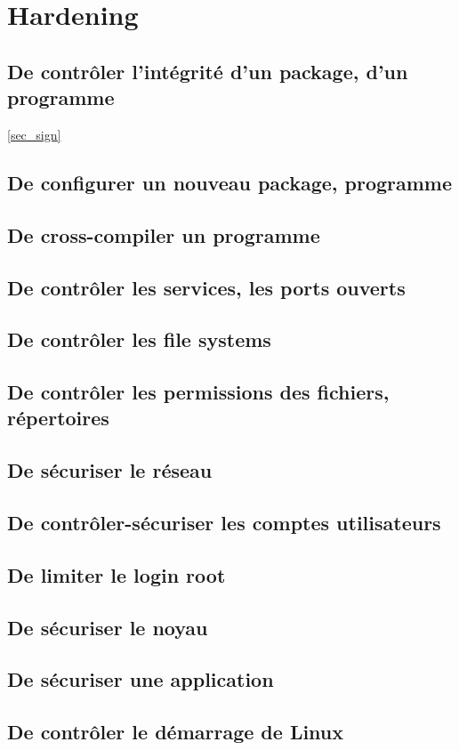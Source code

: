 \documentclass[resume]{subfiles}
\begin{document}
\section{Hardening}

\subsection{De contrôler l’intégrité d’un package, d’un programme}
\ref{sec_sign}

\subsection{De configurer un nouveau package, programme}

\subsection{De cross-compiler un programme}

\subsection{De contrôler les services, les ports ouverts}

\subsection{De contrôler les file systems}

\subsection{De contrôler les permissions des fichiers, répertoires}

\subsection{De sécuriser le réseau}

\subsection{De contrôler-sécuriser les comptes utilisateurs}

\subsection{De limiter le login root}

\subsection{De sécuriser le noyau}

\subsection{De sécuriser une application}

\subsection{De contrôler le démarrage de Linux}
\end{document}

